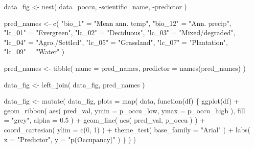 \documentclass[
]{article}
\newenvironment{Shaded}{}{}
\newcommand{\ControlFlowTok}[1]{\textcolor[rgb]{0.00,0.00,1.00}{#1}}
\newcommand{\DataTypeTok}[1]{#1}
\newcommand{\DecValTok}[1]{#1}
\newcommand{\FloatTok}[1]{#1}
\newcommand{\KeywordTok}[1]{\textcolor[rgb]{0.00,0.00,1.00}{#1}}
\newcommand{\NormalTok}[1]{#1}
\newcommand{\OperatorTok}[1]{#1}
\newcommand{\StringTok}[1]{\textcolor[rgb]{0.00,0.50,0.50}{#1}}
\begin{document}
\begin{Shaded}
\begin{Highlighting}[]
\NormalTok{data_fig <-}\StringTok{ }\KeywordTok{nest}\NormalTok{(}
\NormalTok{  data_poccu,}
  \OperatorTok{-}\NormalTok{scientific_name, }\OperatorTok{-}\NormalTok{predictor}
\NormalTok{)}

\NormalTok{pred_names <-}\StringTok{ }\KeywordTok{c}\NormalTok{(}
  \StringTok{"bio_1"}\NormalTok{ =}\StringTok{ "Mean ann. temp"}\NormalTok{,}
  \StringTok{"bio_12"}\NormalTok{ =}\StringTok{ "Ann. precip"}\NormalTok{,}
  \StringTok{"lc_01"}\NormalTok{ =}\StringTok{ "Evergreen"}\NormalTok{,}
  \StringTok{"lc_02"}\NormalTok{ =}\StringTok{ "Deciduous"}\NormalTok{,}
  \StringTok{"lc_03"}\NormalTok{ =}\StringTok{ "Mixed/degraded"}\NormalTok{,}
  \StringTok{"lc_04"}\NormalTok{ =}\StringTok{ "Agro./Settled"}\NormalTok{,}
  \StringTok{"lc_05"}\NormalTok{ =}\StringTok{ "Grassland"}\NormalTok{,}
  \StringTok{"lc_07"}\NormalTok{ =}\StringTok{ "Plantation"}\NormalTok{,}
  \StringTok{"lc_09"}\NormalTok{ =}\StringTok{ "Water"}
\NormalTok{)}

\NormalTok{pred_names <-}\StringTok{ }\KeywordTok{tibble}\NormalTok{(}
  \DataTypeTok{name =}\NormalTok{ pred_names,}
  \DataTypeTok{predictor =} \KeywordTok{names}\NormalTok{(pred_names)}
\NormalTok{)}

\NormalTok{data_fig <-}\StringTok{ }\KeywordTok{left_join}\NormalTok{(}
\NormalTok{  data_fig,}
\NormalTok{  pred_names}
\NormalTok{)}

\NormalTok{data_fig <-}\StringTok{ }\KeywordTok{mutate}\NormalTok{(}
\NormalTok{  data_fig,}
  \DataTypeTok{plots =} \KeywordTok{map}\NormalTok{(}
\NormalTok{    data, }\ControlFlowTok{function}\NormalTok{(df) \{}
      \KeywordTok{ggplot}\NormalTok{(df) }\OperatorTok{+}
\StringTok{        }\KeywordTok{geom_ribbon}\NormalTok{(}
          \KeywordTok{aes}\NormalTok{(}
\NormalTok{            pred_val,}
            \DataTypeTok{ymin =}\NormalTok{ p_occu_low,}
            \DataTypeTok{ymax =}\NormalTok{ p_occu_high}
\NormalTok{          ),}
          \DataTypeTok{fill =} \StringTok{"grey"}\NormalTok{,}
          \DataTypeTok{alpha =} \FloatTok{0.5}
\NormalTok{        ) }\OperatorTok{+}
\StringTok{        }\KeywordTok{geom_line}\NormalTok{(}
          \KeywordTok{aes}\NormalTok{(}
\NormalTok{            pred_val, p_occu}
\NormalTok{          )}
\NormalTok{        ) }\OperatorTok{+}
\StringTok{        }\KeywordTok{coord_cartesian}\NormalTok{(}
          \DataTypeTok{ylim =} \KeywordTok{c}\NormalTok{(}\DecValTok{0}\NormalTok{, }\DecValTok{1}\NormalTok{)}
\NormalTok{        ) }\OperatorTok{+}
\StringTok{        }\KeywordTok{theme_test}\NormalTok{(}
          \DataTypeTok{base_family =} \StringTok{"Arial"}
\NormalTok{        ) }\OperatorTok{+}
\StringTok{        }\KeywordTok{labs}\NormalTok{(}
          \DataTypeTok{x =} \StringTok{"Predictor"}\NormalTok{,}
          \DataTypeTok{y =} \StringTok{"p(Occupancy)"}
\NormalTok{        )}
\NormalTok{    \}}
\NormalTok{  )}
\NormalTok{)}


\end{Highlighting}
\end{Shaded}
\end{document}
